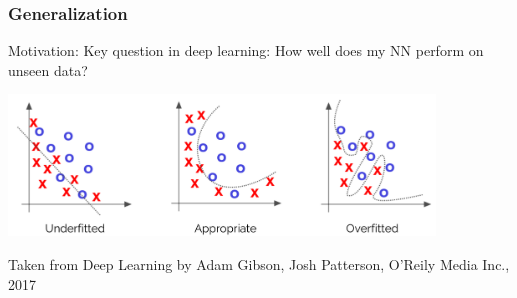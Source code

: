 \begin{frame}
    \frametitle{Generalization}
    \vspace*{0.8cm}
Motivation: Key question in deep learning: How well does my NN perform on unseen data?


\includegraphics[width=0.85\textwidth, height=.5\textheight]{./Ressourcen/Praesentation/Bilder/generalization.png}%

\vspace*{-0.6cm}

Taken from Deep Learning by Adam Gibson, Josh Patterson, O'Reily Media Inc., 2017

\end{frame}
\clearpage

